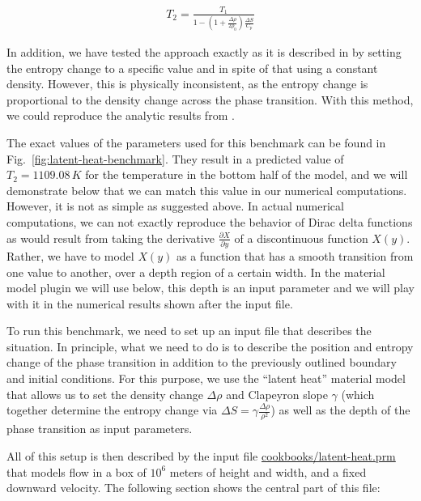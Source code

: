 \documentclass{article}
\begin{document}
\begin{gather*}
T_2 = \frac{T_1}{1 - (1+\frac{\Delta \rho}{2 \rho_0}) \frac{\Delta S}{C_p}}
\end{gather*}

In addition, we have tested the approach exactly as it is described in \cite{STO01} by setting the entropy change to a specific value and in spite of that using a constant density. However, this is physically inconsistent, as the entropy change is proportional to the density change across the phase transition. With this method, we could reproduce the analytic results from \cite{STO01}.

The exact values of the parameters used for this benchmark can be found in
Fig.~\ref{fig:latent-heat-benchmark}. They result in a predicted value of $T_2 =
1109.08 \, \si{K}$ for the temperature in the bottom half of the model, and
we will demonstrate below that we can match this value in our numerical
computations. However, it is not as simple as suggested above. In actual
numerical computations, we can not exactly reproduce the behavior of Dirac delta
functions as would result from taking the derivative $\frac{\partial
X}{\partial y}$ of a discontinuous function $X(y)$. Rather, we have to model
$X(y)$ as a function that has a smooth transition from one value to another,
over a depth region of a certain width. In the material model plugin we will use
below, this depth is an input parameter and we will play with it in the
numerical results shown after the input file.

To run this benchmark, we need to set up an input file that describes the
situation. In principle, what we need to do is to describe the position and
entropy change of the phase transition in addition to the previously outlined
boundary and initial conditions. For this purpose, we use the ``latent heat''
material model that allows us to set the density change $\Delta\rho$ and
Clapeyron slope $\gamma$ (which together determine the entropy change via
$\Delta S = \gamma \frac{\Delta\rho}{\rho^2}$) as well as the depth of the phase
transition as input parameters.

All of this setup is then described by the input file
\url{cookbooks/latent-heat.prm} that models flow in a box of $10^6$ meters of
height and width, and a fixed downward velocity. The following section shows the
central part of this file:


\end{document}
